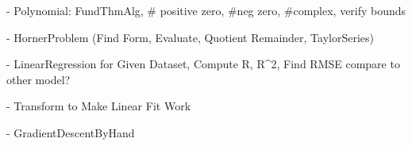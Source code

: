 \documentclass[11pt,letterpaper]{article}
\begin{document}

- Polynomial: FundThmAlg, # positive zero, #neg zero, #complex, verify bounds


- HornerProblem (Find Form, Evaluate, Quotient Remainder, TaylorSeries)


- LinearRegression for Given Dataset, Compute R, R^2, Find RMSE compare to other model?


- Transform to Make Linear Fit Work


- GradientDescentByHand
\end{document}
